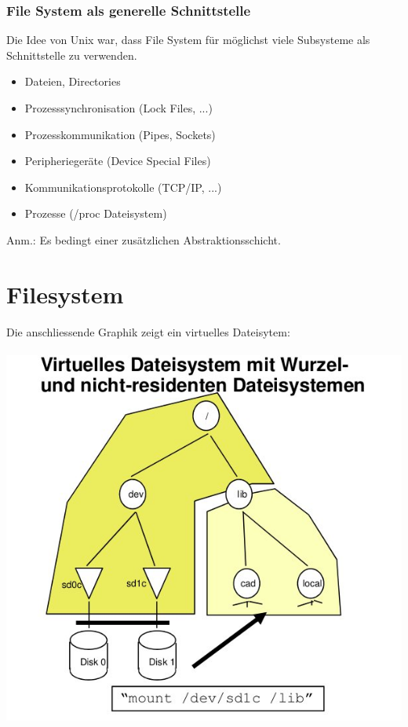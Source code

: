 \documentclass[a4paper, 10pt]{article}
\begin{document}
\subsubsection{File System als generelle Schnittstelle}
Die Idee von Unix war, dass File System für möglichst viele Subsysteme als Schnittstelle zu verwenden.
\begin{itemize}
\item Dateien, Directories
\item Prozesssynchronisation (Lock Files, ...)
\item Prozesskommunikation (Pipes, Sockets)
\item Peripheriegeräte (Device Special Files)
\item Kommunikationsprotokolle (TCP/IP, ...)
\item Prozesse (/proc Dateisystem)
\end{itemize}
Anm.: Es bedingt einer zusätzlichen Abstraktionsschicht.

\newpage
\section{Filesystem}
Die anschliessende Graphik zeigt ein virtuelles Dateisytem:\\
\\
\includegraphics[scale=0.4]{Dateisystem.jpg}\\
\end{document}
